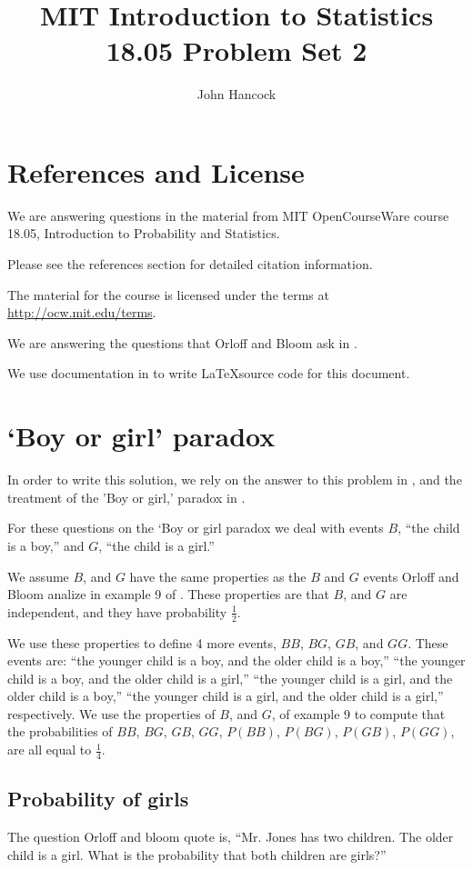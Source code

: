 \documentclass[a4paper,11pt]{article}
\author{John Hancock}
\title{MIT Introduction to Statistics 18.05 Problem Set 2 }
\begin{document}
\maketitle
\tableofcontents
\section{References and License}
We are answering questions in the material from MIT OpenCourseWare
course 18.05, Introduction to Probability and Statistics.

Please see the references section for detailed citation information.

The material for the course is licensed under the terms at 
\url{http://ocw.mit.edu/terms}.

We are answering the questions that Orloff and Bloom ask in
\cite{probSet2}.

We use documentation in  to write \LaTeX source code
for this document.

\section{`Boy or girl' paradox}

In order to write this solution, we rely on the answer to this problem
in \cite{probSet2Ans}, and the treatment of the 'Boy or girl,' paradox
in \cite{boyGirlWiki}.

For these questions on the `Boy or girl paradox we deal with events
$B$, ``the child is a boy,'' and $G$, ``the child is a girl.''

We assume $B$, and $G$ have the same properties as the $B$ and $G$
events Orloff and Bloom analize in example 9 of \cite{reading4}.
These properties are that $B$, and $G$ are independent, and they have
probability $\frac{1}{2}$.

We use these properties to define 4 more events, $BB$, $BG$, $GB$,
and $GG$.  These events are: ``the younger child is a boy, and the older
child is a boy,'' ``the younger child is a boy, and the older child is a
girl,'' ``the younger child is a girl, and the older child is a boy,''
``the younger child is a girl, and the older child is a girl,'' 
respectively.  We use the properties of $B$, and $G$, of example 9 to
compute that the probabilities of $BB$, $BG$, $GB$, $GG$, 
$P\left( BB \right)$, $P\left( BG \right)$, $P\left( GB \right)$, 
$P\left( GG \right)$, are all equal to $\frac{1}{4}$.

\subsection{Probability of girls}
The question Orloff and bloom quote is, ``Mr. Jones has two children. The
older child is a girl. What is the probability that both children are
girls?''
\end{document}
